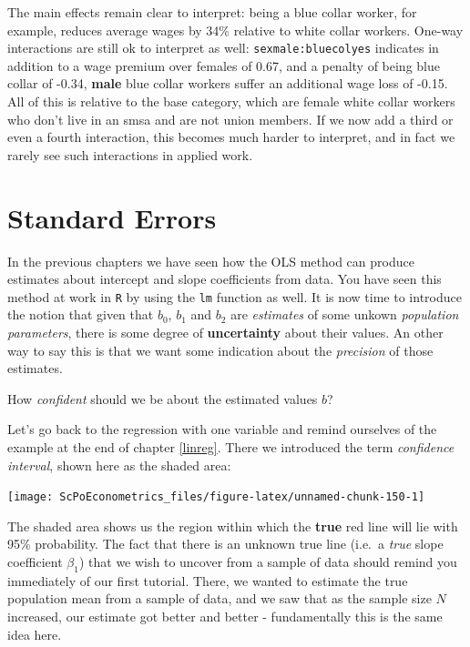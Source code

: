 \documentclass[]{book}
\newenvironment{note}{\begin{tcolorbox}[colback=blue!5!white,colframe=blue!75!black,title=\textbf{Note:}]}{\end{tcolorbox}}
\theoremstyle{definition}
\theoremstyle{definition}
\theoremstyle{definition}
\theoremstyle{remark}
\begin{document}
The main effects remain clear to interpret: being a blue collar worker,
for example, reduces average wages by 34\% relative to white collar
workers. One-way interactions are still ok to interpret as well:
\texttt{sexmale:bluecolyes} indicates in addition to a wage premium over
females of 0.67, and a penalty of being blue collar of -0.34,
\textbf{male} blue collar workers suffer an additional wage loss of
-0.15. All of this is relative to the base category, which are female
white collar workers who don't live in an smsa and are not union
members. If we now add a third or even a fourth interaction, this
becomes much harder to interpret, and in fact we rarely see such
interactions in applied work.

\chapter{Standard Errors}\label{std-errors}

In the previous chapters we have seen how the OLS method can produce
estimates about intercept and slope coefficients from data. You have
seen this method at work in \texttt{R} by using the \texttt{lm} function
as well. It is now time to introduce the notion that given that \(b_0\),
\(b_1\) and \(b_2\) are \emph{estimates} of some unkown \emph{population
parameters}, there is some degree of \textbf{uncertainty} about their
values. An other way to say this is that we want some indication about
the \emph{precision} of those estimates.

\begin{note}
How \emph{confident} should we be about the estimated values \(b\)?
\end{note}

 Let's go back to the regression with one variable and remind ourselves
of the example at the end of chapter \ref{linreg}. There we introduced
the term \emph{confidence interval}, shown here as the shaded area:

\begin{center}\texttt{[image: ScPoEconometrics\_files/figure-latex/unnamed-chunk-150-1]} \end{center}

The shaded area shows us the region within which the \textbf{true} red
line will lie with 95\% probability. The fact that there is an unknown
true line (i.e.~a \emph{true} slope coefficient \(\beta_1\)) that we
wish to uncover from a sample of data should remind you immediately of
our first tutorial. There, we wanted to estimate the true population
mean from a sample of data, and we saw that as the sample size \(N\)
increased, our estimate got better and better - fundamentally this is
the same idea here.
\end{document}
